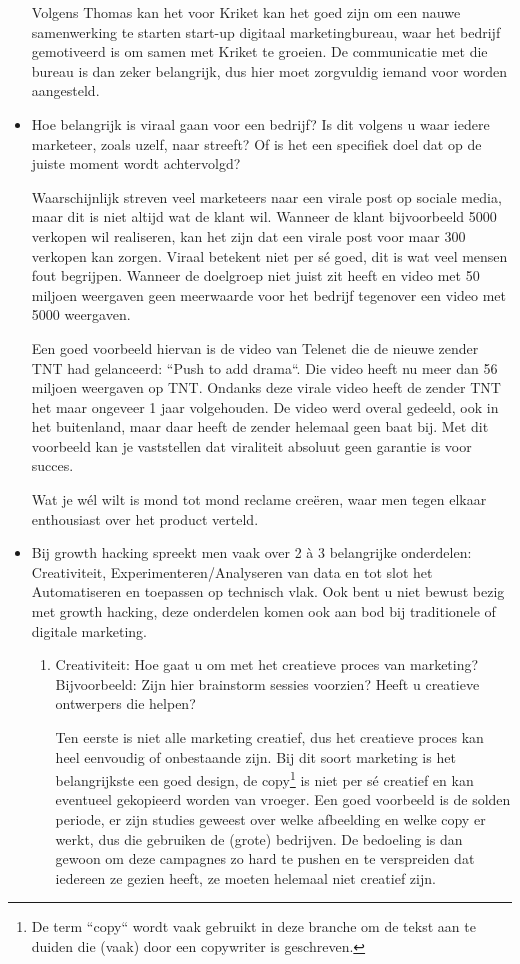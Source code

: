 \begin{itemize}
	Volgens Thomas kan het voor Kriket kan het goed zijn om een nauwe samenwerking te starten start-up digitaal marketingbureau, waar het bedrijf gemotiveerd is om samen met Kriket te groeien. De communicatie met die bureau is dan zeker belangrijk, dus hier moet zorgvuldig iemand voor worden aangesteld.
	
	\item Hoe belangrijk is viraal gaan voor een bedrijf? Is dit volgens u waar iedere marketeer, zoals uzelf, naar streeft? Of is het een specifiek doel dat op de juiste moment wordt achtervolgd?
	
	Waarschijnlijk streven veel marketeers naar een virale post op sociale media, maar dit is niet altijd wat de klant wil. Wanneer de klant bijvoorbeeld 5000 verkopen wil realiseren, kan het zijn dat een virale post voor maar 300 verkopen kan zorgen. Viraal betekent niet per sé goed, dit is wat veel mensen fout begrijpen. Wanneer de doelgroep niet juist zit heeft en video met 50 miljoen weergaven geen meerwaarde voor het bedrijf tegenover een video met 5000 weergaven.
	
	Een goed voorbeeld hiervan is de video van Telenet die de nieuwe zender TNT had gelanceerd: ``Push to add drama``. Die video heeft nu meer dan 56 miljoen weergaven op TNT. Ondanks deze virale video heeft de zender TNT het maar ongeveer 1 jaar volgehouden. De video werd overal gedeeld, ook in het buitenland, maar daar heeft de zender helemaal geen baat bij. Met dit voorbeeld kan je vaststellen dat viraliteit absoluut geen garantie is voor succes.
	
	Wat je wél wilt is mond tot mond reclame creëren, waar men tegen elkaar enthousiast over het product verteld.
	
	\item Bij growth hacking spreekt men vaak over 2 à 3 belangrijke onderdelen: Creativiteit, Experimenteren/Analyseren van data en tot slot het Automatiseren en toepassen op technisch vlak. Ook bent u niet bewust bezig met growth hacking, deze onderdelen komen ook aan bod bij traditionele of digitale marketing.
	\begin{enumerate}[label*=\arabic*.]
		\item Creativiteit: Hoe gaat u om met het creatieve proces van marketing? Bijvoorbeeld: Zijn hier brainstorm sessies voorzien? Heeft u creatieve ontwerpers die helpen?
		
		Ten eerste is niet alle marketing creatief, dus het creatieve proces kan heel eenvoudig of onbestaande zijn. Bij dit soort marketing is het belangrijkste een goed design, de copy\footnote{De term ``copy`` wordt vaak gebruikt in deze branche om de tekst aan te duiden die (vaak) door een copywriter is geschreven.} is niet per sé creatief en kan eventueel gekopieerd worden van vroeger. Een goed voorbeeld is de solden periode, er zijn studies geweest over welke afbeelding en welke copy er werkt, dus die gebruiken de (grote) bedrijven. De bedoeling is dan gewoon om deze campagnes zo hard te pushen en te verspreiden dat iedereen ze gezien heeft, ze moeten helemaal niet creatief zijn.
		

\end{enumerate}
\end{itemize}
